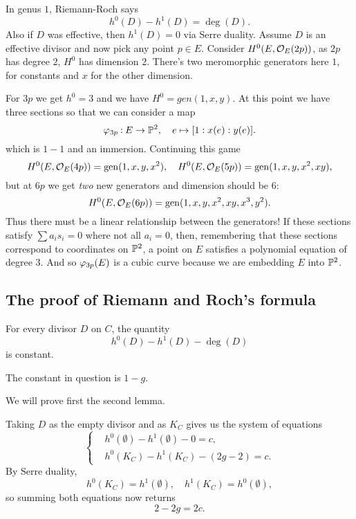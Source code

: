 \documentclass[12pt]{memoir}
\begin{document}
\begin{ptcbp}
    In genus $1$, Riemann-Roch says
    $$h^0(D)-h^1(D)=\deg(D).$$
    Also if $D$ was effective, then $h^1(D)=0$ via Serre duality. Assume $D$ is an effective divisor and now pick any point $p\in E$. Consider $H^0(E,\mathcal{O}_E(2p))$, as $2p$ has degree $2$, $H^0$ has dimension $2$. There's two meromorphic generators here $1$, for constants and $x$ for the other dimension.\par
    For $3p$ we get $h^0=3$ and we have $H^0=gen(1,x,y)$. At this point we have three sections so that we can consider a map
    $$\varphi_{3p}\mathbin{:} E\to\mathbb{P}^2,\quad e\mapsto[1:x(e):y(e)].$$
    which is $1-1$ and an immersion. Continuing this game 
    $$H^0(E,\mathcal{O}_E(4p))=\operatorname{gen}(1,x,y,x^2),\quad H^0(E,\mathcal{O}_E(5p))=\operatorname{gen}(1,x,y,x^2,xy),$$
    but at $6p$ we get \emph{two} new generators and dimension should be $6$:
    $$H^0(E,\mathcal{O}_E(6p))=\operatorname{gen}(1,x,y,x^2,xy,x^3,y^2).$$
    Thus there must be a linear relationship between the generators! If these sections satisfy $\sum a_is_i=0$ where not all $a_i=0$, then, remembering that these sections correspond to coordinates on $\mathbb{P}^2$, a point on $E$ satisfies a polynomial equation of degree $3$. And so $\varphi_{3p}(E)$ is a cubic curve because we are embedding $E$ into $\mathbb{P}^2$.
\end{ptcbp}

\subsection{The proof of Riemann and Roch's formula}

\begin{Lem}
    For every divisor $D$ on $C$, the quantity
    $$h^0(D)-h^1(D)-\deg(D)$$
    is constant.
\end{Lem}

\begin{Lem}
    The constant in question is $1-g$.
\end{Lem}

We will prove first the second lemma.

\begin{ptcbp}
    Taking $D$ as the empty divisor and as $K_C$ gives us the system of equations
    $$
    \left\lbrace
    \begin{aligned}
        &h^0(\emptyset)-h^1(\emptyset)-0=c,\\
        &h^0(K_C)-h^1(K_C)-(2g-2)=c.
    \end{aligned}
    \right.
    $$
    By Serre duality, 
    $$h^0(K_C)=h^1(\emptyset),\quad h^1(K_C)=h^0(\emptyset),$$
    so summing both equations now returns
    $$2-2g=2c.$$
\end{ptcbp}
\end{document}
